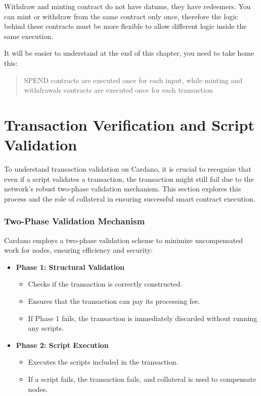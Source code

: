 Withdraw and minting contract do not have datums, they have redeemers.
You can mint or withdraw from the same contract only once, therefore the logic behind these contracts must be more flexible to allow different logic inside the same execution.

It will be easier to understand at the end of this chapter, you need to take home this:

\begin{quote}
    SPEND contracts are executed once for each input, while minting and withdrawals contracts are executed once for each transaction
\end{quote}



\section{Transaction Verification and Script Validation}


To understand transaction validation on Cardano, it is crucial to recognize that even if a script validates a transaction, the transaction might still fail due to the network's robust two-phase validation mechanism. This section explores this process and the role of collateral in ensuring successful smart contract execution.

\subsubsection{Two-Phase Validation Mechanism}

Cardano employs a two-phase validation scheme to minimize uncompensated work for nodes, ensuring efficiency and security:

\begin{itemize}
    \item \textbf{Phase 1: Structural Validation}
    \begin{itemize}
        \item Checks if the transaction is correctly constructed.
        \item Ensures that the transaction can pay its processing fee.
        \item If Phase 1 fails, the transaction is immediately discarded without running any scripts.
    \end{itemize}
    \item \textbf{Phase 2: Script Execution}
    \begin{itemize}
        \item Executes the scripts included in the transaction.
        \item If a script fails, the transaction fails, and collateral is used to compensate nodes.
    \end{itemize}
\end{itemize}

